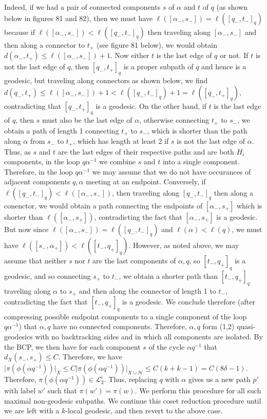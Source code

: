 \documentclass[12pt]{article}
\newcommand{\vs}{\vskip10pt}
\begin{document}
	\vs
	
	Indeed, if we had a pair of connected components $s$ of $\alpha$ and $t$ of $q$ (as shown below in figures 81 and 82), then we must have $\ell([\alpha_-, s_-]) = \ell([q_-, t_-]_q)$ because if $\ell([\alpha_-, s_-]) < \ell([q_-, t_-]_q)$ then traveling along $[\alpha_-, s_-]$ and then along a connector to $t_+$ (see figure 81 below), we would obtain $d(\alpha_-, t_+) \leq \ell([\alpha_-, s_-]) + 1$. Now either $t$ is the last edge of $q$ or not. If $t$ is not the last edge of $q$, then $[q_-, t_+]_q$ is a proper subpath of $q$ and hence is a geodesic, but traveling along connectors as shown below, we find $d(q_-, t_+) \leq \ell([\alpha_-, s_-]) + 1 < \ell([q_-, t_-]_q) + 1 = \ell([q_-, t_+]_q)$, contradicting that $[q_-, t_+]_q$ is a geodesic. On the other hand, if $t$ is the last edge of $q$, then $s$ must also be the last edge of $\alpha$, otherwise connecting $t_+$ to $s_-$, we obtain a path of length 1 connecting $t_+$ to $s_-$, which is shorter than the path along $\alpha$ from $s_-$ to $t_+$, which has length at least 2 if $s$ is not the last edge of $\alpha$. Thus, as $s$ and $t$ are the last edges of their respective paths and are both $H_i$ components, in the loop $q\alpha^{-1}$ we combine $s$ and $t$ into a single component. Therefore, in the loop $q\alpha^{-1}$ we may assume that we do not have occurances of adjacent components $q, \alpha$ meeting at an endpoint. Conversely, if $\ell([q_-, t_-]_q) < \ell([\alpha_-, s_-])$, then traveling along $[q_-, t_-]_q$ then along a conenctor, we would obtain a path connecting the endpoints of $[\alpha_-, s_+]$ which is shorter than $\ell([\alpha_-, s_+])$, contradicting the fact that $[\alpha_-, s_+]$ is a geodesic. But now since $\ell([\alpha_-, s_-]) = \ell([q_-, t_-]_q)$ and $\ell(\alpha) < \ell(q)$, we must have $\ell([s_-, \alpha_+]) < \ell([t_-, q_+]_q)$. However, as noted above, we may assume that neither $s$ nor $t$ are the last components of $\alpha, q$, so $[t_-, q_+]_q$ is a geodesic, and so connecting $s_+$ to $t_-$, we obtain a shorter path than $[t_-, q_+]_q$ traveling along $\alpha$ to $s_+$ and then along the connector of length 1 to $t_-$, contradicting the fact that $[t_-, q_+]_q$ is a geodesic. We conclude therefore (after compressing possible endpoint components to a single component of the loop $q \alpha^{-1}$) that $\alpha, q$ have no connected components. Therefore, $\alpha, q$ form (1,2) quasi-geodesics with no backtracking sides and in which all components are isolated. By the BCP, we then have for each component $s$ of the cycle $\alpha q^{-1}$ that $d_X(s_-, s_+) \leq C$. Therefore, we have $\vert \pi(\phi(\alpha q^{-1})) \vert_X \leq C \vert \pi(\phi(\alpha q^{-1})) \vert_{X \cup \mathcal{H}} \leq C(k + k - 1) = C(8 \delta - 1)$. Therefore, $\pi(\phi(\alpha q^{-1})) \in \mathcal{L}_2^i$. Thus, replacing $q$ with $\alpha$ gives us a new path $p'$ with label $w'$ such that $\pi(w') = \pi(w)$. We perform this procedure for all such maximal non-geodesic subpaths. We continue this coset reduction procedure until we are left with a $k$-local geodesic, and then revert to the above case. 
	
\end{document}
